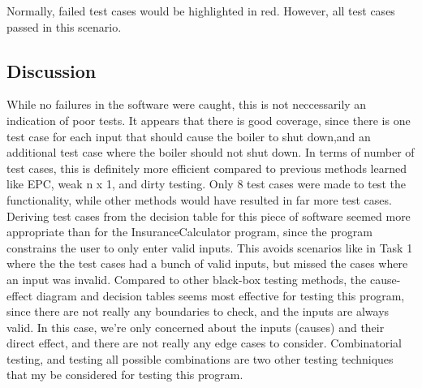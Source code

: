 Normally, failed test cases would be highlighted in red. However, all test
cases passed in this scenario.


\subsection{Discussion}
While no failures in the software were caught, this is not neccessarily an
indication of poor tests. It appears that there is good coverage, since
there is one test case for each input that should cause the boiler to shut down,and an additional test case where the boiler should not shut down.
In terms of number of test cases, this is definitely more
efficient compared to previous methods learned like EPC, weak n x 1, and dirty
testing. Only 8 test cases were made to test the functionality, while other
methods would have resulted in far more test cases. Deriving test cases from
the decision table for this piece of software seemed
more appropriate than for the InsuranceCalculator program, since the program
constrains the user to only enter valid inputs. This avoids scenarios like in
Task 1 where the the test cases had a bunch of valid inputs, but missed the
cases where an input was invalid. Compared to other black-box testing methods,
the cause-effect diagram and decision tables seems most effective for testing
this program, since there are not really any boundaries to check, and the
inputs are always valid. In this case, we're only concerned about the inputs
(causes) and their direct effect, and there are not really any edge cases to
consider. Combinatorial testing, and testing all possible combinations are two
other testing techniques that my be considered for testing this program. 
